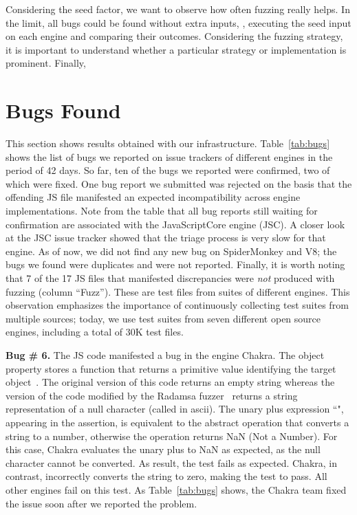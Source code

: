 \documentclass[10pt,conference,anonymous]{IEEEtran}
\begin{document}
Considering the seed factor, we want to observe how often fuzzing
really helps. In the limit, all bugs could be found without extra
inputs, \ie{}, executing the seed input on each engine and comparing
their outcomes. Considering the fuzzing strategy, it is important to
understand whether a particular strategy or implementation is
prominent. Finally, 

\section{Bugs Found}
\label{sec:results}


This section shows results obtained with our
infrastructure. Table~\ref{tab:bugs} shows the list of bugs we
reported on issue trackers of different engines in the period of 42
days. So far, ten of the bugs we reported
were confirmed, two of which were fixed. One bug report we
submitted was rejected on the basis that the offending JS file
manifested an expected incompatibility across engine
implementations.
Note from the table that all bug
reports still waiting for confirmation are associated with the
JavaScriptCore engine (JSC). A closer look at the JSC issue tracker
showed that the triage process is very slow for that engine. As of
now, we did not find any new bug on SpiderMonkey and V8; the bugs we
found were duplicates and were not reported. Finally, it is
worth noting that 7 of the 17 JS files that manifested
discrepancies were \emph{not} produced with fuzzing (column
``Fuzz''). These are test files from suites of different engines. This
observation emphasizes the importance of continuously collecting test suites from
multiple sources; today, we use test suites from seven different open
source engines, including a total of 30K test files.

\vspace{1ex}\noindent\textbf{Bug \# 6.} The JS code  
manifested a bug in the \js{} engine Chakra.  The object
property  stores a function that returns a primitive
value identifying the target object~\cite{valueof}. The original
version of this code returns an empty string whereas the version of
the code modified by the Radamsa fuzzer~\cite{radamsa} returns a string
representation of a null character (called  in ascii). The
unary plus expression ``", appearing in the assertion, is
equivalent to the abstract operation 
that converts a string to a number, otherwise the operation returns
NaN (Not a Number)\cite{unary-plus}. For this case, Chakra evaluates
the unary plus to NaN as expected, as the null character cannot be
converted. As result, the test fails as expected. Chakra, in contrast,
incorrectly converts the string to zero, making the test to pass. All
other engines fail on this test. As Table~\ref{tab:bugs} shows, the
Chakra team fixed the issue soon after we reported the problem.



%


\end{document}
